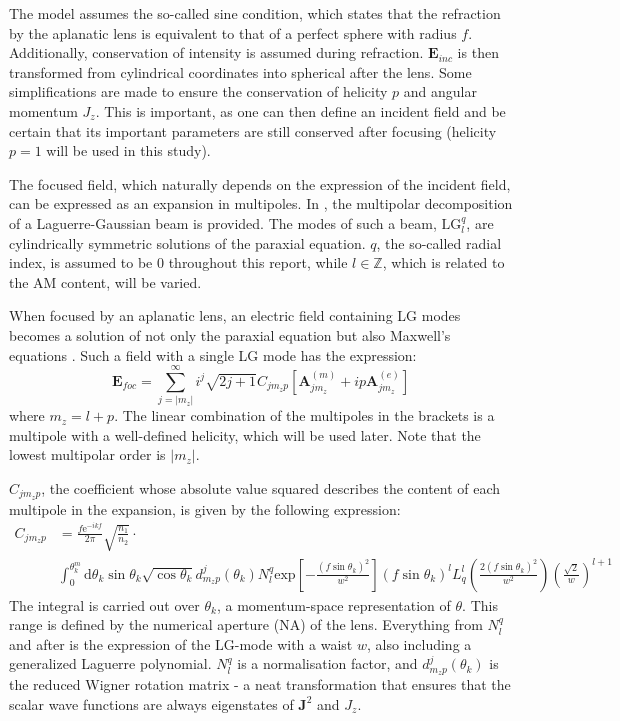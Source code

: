 The model assumes the so-called sine condition, which states that the refraction by the aplanatic lens is equivalent to that of a perfect sphere with radius \( f \). Additionally, conservation of intensity is assumed during refraction. \( \mathbf{E}_{inc} \) is then transformed from cylindrical coordinates into spherical after the lens. Some simplifications are made to ensure the conservation of helicity \( p \) and angular momentum \( J_z \). This is important, as one can then define an incident field and be certain that its important parameters are still conserved after focusing (helicity \( p = 1 \) will be used in this study).

The focused field, which naturally depends on the expression of the incident field, can be expressed as an expansion in multipoles. In \cite{xavi}, the multipolar decomposition of a Laguerre-Gaussian beam is provided. The modes of such a beam, \( \mathrm{LG}_l^q \), are cylindrically symmetric solutions of the paraxial equation. \( q \), the so-called radial index, is assumed to be 0 throughout this report, while \( l \in \mathbb{Z} \), which is related to the AM content, will be varied.

When focused by an aplanatic lens, an electric field containing LG modes becomes a solution of not only the paraxial equation but also Maxwell's equations \cite{xavi}. Such a field with a single LG mode has the expression:
\begin{equation}\label{eq:Efoc}
    \mathbf{E}_{foc} = \sum_{j=\lvert m_z \rvert}^\infty i^j \sqrt{2j+1} C_{jm_z p} \left[ \mathbf{A}_{jm_z}^{(m)} + i p \mathbf{A}_{jm_z}^{(e)} \right]
\end{equation}
where \( m_z = l + p \). The linear combination of the multipoles in the brackets is a multipole with a well-defined helicity, which will be used later. Note that the lowest multipolar order is \( \lvert m_z \rvert \).

\( C_{jm_z p} \), the coefficient whose absolute value squared describes the content of each multipole in the expansion, is given by the following expression:
\begin{align}
    \label{eq:C_foc}
    C_{jm_z p} &= \frac{f \mathrm{e}^{-i k f}}{2 \pi} \sqrt{\frac{n_1}{n_2}} \cdot \\
    &\int_0^{\theta_k^{m}} \mathrm{d} \theta_k \sin \theta_k \sqrt{\cos \theta_k} d^j_{m_z p}(\theta_k) N_l^q \mathrm{exp} \left[ -\frac{(f \sin \theta_k)^2}{w^2} \right] (f \sin \theta_k)^l L_q^l \left( \frac{2 (f \sin \theta_k)^2}{w^2} \right) \left( \frac{\sqrt{2}}{w} \right)^{l+1}
\end{align}
The integral is carried out over \( \theta_k \), a momentum-space representation of \( \theta \). This range is defined by the numerical aperture (NA) of the lens. 
Everything from \( N_l^q \) and after is the expression of the \( \mathrm{LG} \)-mode with a waist \( w \), also including a generalized Laguerre polynomial. \( N_l^q \) is a normalisation factor, and \( d^j_{m_z p}(\theta_k) \) is the reduced Wigner rotation matrix - a neat transformation that ensures that the scalar wave functions are always eigenstates of \( \mathbf{J}^2 \) and \( J_z \).

